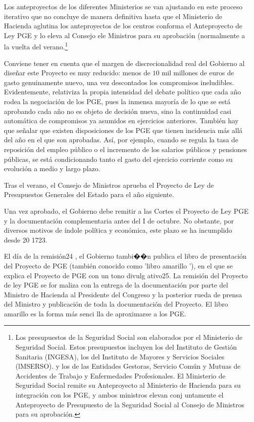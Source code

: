 \documentclass[10pt,a4paper]{article}
\begin{document}
Los anteproyectos de los diferentes Ministerios se van ajustando en este proceso iterativo que no concluye de manera definitiva hasta que el Ministerio de Hacienda aglutina los anteproyectos de los centros conforma el Anteproyecto de Ley PGE y lo eleva al Consejo ele Ministros para su aprobación (normalmente a la vuelta del verano.\footnote{%
    Los presupuestos de la Seguridad Social son elaborados por el Ministerio de Seguridad Social. Estos presupuestos incluyen los del Instituto de Gestión Sanitaria (INGESA), los del Instituto de Mayores y Servicios Sociales (lMSERSO). y los de las Entidades Gestoras, Servicio Común y Mutuas de Accidentes de Trabajo y Enfermedades Profesionales. El Ministerio de Seguridad Social remite su Anteproyecto al Ministerio de Hacienda para su integración con los PGE, y ambos ministros elevan conj untamente el Anteproyecto de Presupuesto de la Seguridad Social al Consejo de Ministros para su aprobación.
}

Conviene tener en cuenta que el margen de discrecionalidad real del Gobierno al diseñar este Proyecto es muy reducido: menos de $10$ mil millones de euros de gasto genuinamente nuevo, una vez descontados los compromisos ineludibles. Evidentemente, relativiza la propia intensidad del debate político que cada año rodea la negociación de los PGE, pues la inmensa mayoría de lo que se está aprobando cada año no es objeto de decisión nueva, sino la continuidad casi automática de compromisos ya asumidos en ejercicios anteriores. También hay que señalar que existen disposiciones de los PGE que tienen incidencia más allá del año en el que son aprobadas. Así, por ejemplo, cuando se regula la tasa de reposición del empleo público o el incremento de los salarios públicos y pensiones públicas, se está condicionando tanto el gasto del ejercicio corriente como su evolución a medio y largo plazo.

Tras el verano, el Consejo de Ministros aprueba el Proyecto de Ley de Presupuestos Generales del Estado para el año siguiente.

Una vez aprobado, el Gobierno debe remitir a las Cortes el Proyecto de Ley PGE y la documentación complementaria antes del I de octubre. No obstante, por diversos motivos de índole política y económica, este plazo se ha incumplido desde 20 1723.

El día de la remisión24 , el Gobierno tambi��n publica el libro de presentación del Proyecto de PGE (también conocido como 'libro amarillo '), en el que se explica el Proyecto de PGE con un tono divulg ativo25. La remisión del Proyecto de ley PGE se for maliza con la entrega de la documentación por parte del Ministro de Hacienda al Presidente del Congreso y la posterior rueda de prensa del Ministro y publicación de toda la documentación del Proyecto. El libro amarillo es la forma más senci lla de aproximarse a los PGE.
\end{document}
